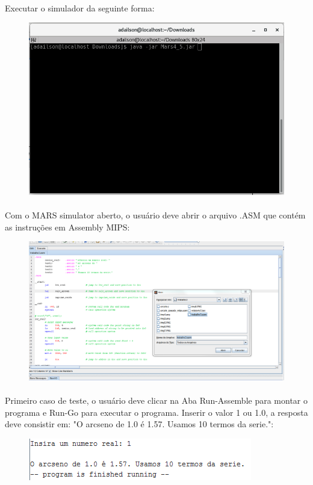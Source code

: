 \documentclass[a4paper, 12pt]{article}
\begin{document}
		\paragraph{}    Executar o simulador da seguinte forma:
		\begin{figure}[H]
			\centering
			\includegraphics[scale=0.5]{img2.png}
		\end{figure}
        \paragraph{}    Com o MARS simulator aberto, o usu\'ario deve abrir o arquivo .ASM que cont\'em as instru\c{c}\~oes em Assembly MIPS:
        \begin{figure}[H]
        	\centering
        	\includegraphics[scale=0.5]{img3.png}
        \end{figure}
        \paragraph{}    Primeiro caso de teste, o usu\'ario deve clicar na Aba Run-Assemble para montar o programa e Run-Go para executar o programa. Inserir o valor 1 ou 1.0, a resposta deve consistir em: "O arcseno de 1.0 \'e 1.57. Usamos 10 termos da serie.":
        \begin{figure}[H]
        	\centering
        	\includegraphics[scale=0.8]{img5.png}
        \end{figure}
\end{document}
